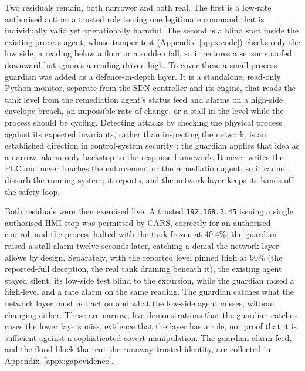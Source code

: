 Two residuals remain, both narrower and both real. The first is a low-rate authorised action: a trusted role issuing one legitimate command that is individually valid yet operationally harmful. The second is a blind spot inside the existing process agent, whose tamper test (Appendix~\ref{appx:code}) checks only the low side, a reading below a floor or a sudden fall, so it restores a sensor spoofed downward but ignores a reading driven high. To cover these a small process guardian was added as a defence-in-depth layer. It is a standalone, read-only Python monitor, separate from the SDN controller and its engine, that reads the tank level from the remediation agent's status feed and alarms on a high-side envelope breach, an impossible rate of change, or a stall in the level while the process should be cycling. Detecting attacks by checking the physical process against its expected invariants, rather than inspecting the network, is an established direction in control-system security \cite{cardenas2011attacks}; the guardian applies that idea as a narrow, alarm-only backstop to the response framework. It never writes the PLC and never touches the enforcement or the remediation agent, so it cannot disturb the running system; it reports, and the network layer keeps its hands off the safety loop.

Both residuals were then exercised live. A trusted \texttt{192.168.2.45} issuing a single authorised HMI stop was permitted by CARS, correctly for an authorised control, and the process halted with the tank frozen at 40.4\%; the guardian raised a stall alarm twelve seconds later, catching a denial the network layer allows by design. Separately, with the reported level pinned high at 90\% (the reported-full deception, the real tank draining beneath it), the existing agent stayed silent, its low-side test blind to the excursion, while the guardian raised a high-level and a rate alarm on the same reading. The guardian catches what the network layer must not act on and what the low-side agent misses, without changing either. These are narrow, live demonstrations that the guardian catches cases the lower layers miss, evidence that the layer has a role, not proof that it is sufficient against a sophisticated covert manipulation. The guardian alarm feed, and the flood block that cut the runaway trusted identity, are collected in Appendix~\ref{appx:gapevidence}.

